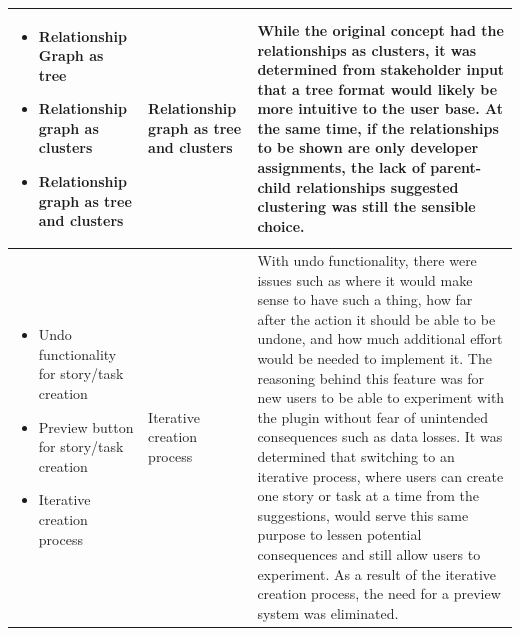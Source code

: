 \begin{table}[!h]
\begin{tabularx}{\textwidth}{|p{3cm}|p{3cm}|X|}
	\hline
	\begin{itemize}
		\item Relationship Graph as tree
		\item Relationship graph as clusters
		\item Relationship graph as tree and clusters
	\end{itemize} & 
	Relationship graph as tree and clusters & While the original concept had the relationships as clusters, it was determined from stakeholder input that a tree format would likely be more intuitive to the user base. At the same time, if the relationships to be shown are only developer assignments, the lack of parent-child relationships suggested clustering was still the sensible choice.\\
	\hline
	\begin{itemize}
		\item Undo functionality for story/task creation
		\item Preview button for story/task creation
		\item Iterative creation process
	\end{itemize} & 
	Iterative creation process & With undo functionality, there were issues such as where it would make sense to have such a thing, how far after the action it should be able to be undone, and how much additional effort would be needed to implement it. The reasoning behind this feature was for new users to be able to experiment with the plugin without fear of unintended consequences such as data losses. It was determined that switching to an iterative process, where users can create one story or task at a time from the suggestions, would serve this same purpose to lessen potential consequences and still allow users to experiment. As a result of the iterative creation process, the need for a preview system was eliminated.\\
	\hline
	\end{tabularx}
\label{tab:UIUXDesignChoices}
\end{table}